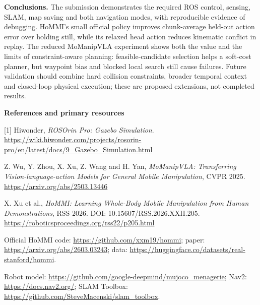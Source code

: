 \documentclass[10pt,a4paper]{article}
\begin{document}
\textbf{Conclusions.} The submission demonstrates the required ROS control, sensing, SLAM, map saving and both navigation modes, with reproducible evidence of debugging. HoMMI's small official policy improves chunk-average held-out action error over holding still, while its relaxed head action reduces kinematic conflict in replay. The reduced MoManipVLA experiment shows both the value and the limits of constraint-aware planning: feasible-candidate selection helps a soft-cost planner, but waypoint bias and blocked local search still cause failures. Future validation should combine hard collision constraints, broader temporal context and closed-loop physical execution; these are proposed extensions, not completed results.

\vfill
\textbf{References and primary resources}\par
\small
[1] Hiwonder, \emph{ROSOrin Pro: Gazebo Simulation}.\newline
\url{https://wiki.hiwonder.com/projects/rosorin-pro/en/latest/docs/9_Gazebo_Simulation.html}\par
[2] Z. Wu, Y. Zhou, X. Xu, Z. Wang and H. Yan, \emph{MoManipVLA: Transferring Vision-language-action Models for General Mobile Manipulation}, CVPR 2025.\newline
\url{https://arxiv.org/abs/2503.13446}\par
[3] X. Xu et al., \emph{HoMMI: Learning Whole-Body Mobile Manipulation from Human Demonstrations}, RSS 2026. DOI: 10.15607/RSS.2026.XXII.205.\newline
\url{https://roboticsproceedings.org/rss22/p205.html}\par
[4] Official HoMMI code: \url{https://github.com/xxm19/hommi}; paper: \url{https://arxiv.org/abs/2603.03243}; data: \url{https://huggingface.co/datasets/real-stanford/hommi}.\par
[5] Robot model: \url{https://github.com/google-deepmind/mujoco_menagerie}; Nav2: \url{https://docs.nav2.org/}; SLAM Toolbox: \url{https://github.com/SteveMacenski/slam_toolbox}.
\end{document}

